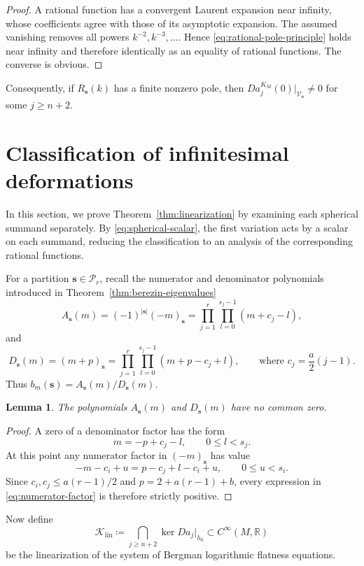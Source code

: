 \documentclass[11pt,reqno]{amsart}
\newtheorem{lemma}[theorem]{Lemma}
\theoremstyle{corollary}
\theoremstyle{conjecture}
\theoremstyle{assumption}
\theoremstyle{proposition}
\theoremstyle{remark}
\numberwithin{equation}{section}
\begin{document}
\begin{proof}
A rational function has a convergent Laurent expansion near infinity, whose coefficients agree with those of its asymptotic expansion. The assumed vanishing removes all powers $k^{-2},k^{-3},\ldots$. Hence \eqref{eq:rational-pole-principle} holds near infinity and therefore identically as an equality of rational functions. The converse is obvious.
\end{proof}
Consequently, if $R_{\mathbf s}(k)$ has a finite nonzero pole, then $Da^{K_M}_j(0)|_{\mathcal V_{\mathbf s}}\neq 0$ for some $j\geq n+2$.

\section{Classification of infinitesimal deformations}
\label{sec:infinitesimal-deformations}

In this section, we prove Theorem~\ref{thm:linearization} by examining each spherical summand separately. By \eqref{eq:spherical-scalar}, the first variation acts by a scalar on each summand, reducing the classification to an analysis of the corresponding rational functions.

For a partition $\mathbf s\in \mathcal P_r$, recall the numerator and denominator polynomials introduced in Theorem~\ref{thm:berezin-eigenvalues}
\[
A_{\mathbf s}(m)=(-1)^{|\mathbf s|}(-m)_{\mathbf s}=\prod_{j=1}^r\prod_{l=0}^{s_j-1}(m+c_j-l),
\]
and
\[
D_{\mathbf s}(m)=(m+p)_{\mathbf s}=\prod_{j=1}^r\prod_{l=0}^{s_j-1}(m+p-c_j+l),\qquad \text{where }c_j=\frac{a}{2}(j-1).
\]
Thus $b_m(\mathbf s)=A_{\mathbf s}(m)/D_{\mathbf s}(m)$.

\begin{lemma}\label{lem:no-cancellation}
The polynomials $A_{\mathbf s}(m)$ and $D_{\mathbf s}(m)$ have no common zero.
\end{lemma}
\begin{proof}
A zero of a denominator factor has the form 
\[
m=-p+c_j-l,\qquad 0\leq l<s_j.
\]
At this point any numerator factor in $(-m)_{\mathbf s}$ has value
\begin{equation}\label{eq:numerator-factor}
-m-c_i+u=p-c_j+l-c_i+u,\qquad 0\leq u<s_i.
\end{equation}
Since $c_i,c_j\leq a(r-1)/2$ and $p=2+a(r-1)+b$, every expression in \eqref{eq:numerator-factor} is therefore strictly positive.
\end{proof}

Now define
\begin{equation}\label{eq:linearized-kernel}
\mathcal K_{\operatorname{lin}}\coloneq\bigcap_{j\geq n+2} \ker Da_j|_{h_0}\subset C^{\infty}(M,\mathbb{R})
\end{equation}
be the linearization of the system of Bergman logarithmic flatness equations.
\end{document}
